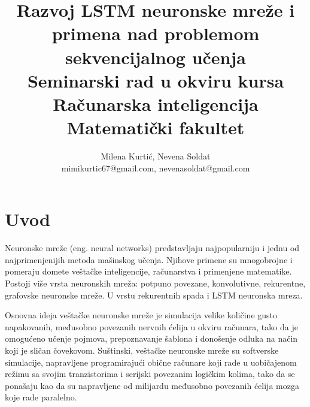 \documentclass[a4paper]{article}
\begin{document}
\title{Razvoj LSTM neuronske mreže i primena nad problemom sekvencijalnog učenja\\ \small{Seminarski rad u okviru kursa\\Računarska inteligencija\\ Matematički fakultet}}

\author{Milena Kurtić, Nevena Soldat\\ mimikurtic67@gmail.com, nevenasoldat@gmail.com}


\maketitle


\tableofcontents

\newpage

\section{Uvod}
\label{sec:uvod}

Neuronske mreže (eng. neural networks) predstavljaju najpopularniju i jednu od najprimenjenijih metoda mašinskog učenja. Njihove primene su mnogobrojne i pomeraju domete veštačke inteligencije, računarstva i primenjene matematike. Postoji više vrsta neuronskih mreža: potpuno povezane, konvolutivne, rekurentne, grafovske neuronske mreže. U vrstu rekurentnih spada i LSTM neuronska mreza.

Osnovna ideja veštačke neuronske mreže je simulacija velike količine gusto napakovanih, međusobno  povezanih nervnih  ćelija u okviru računara, tako da je omogućeno učenje pojmova, prepoznavanje šablona i donošenje odluka na način koji je sličan čovekovom. Suštinski, veštačke neuronske mreže su softverske simulacije, napravljene programirajući obične računare koji rade u uobičajenom režimu sa svojim tranzistorima i serijski povezanim logičkim  kolima, tako da se ponašaju kao da su napravljene od milijardu međusobno povezanih ćelija mozga koje rade paralelno. 
\end{document}
